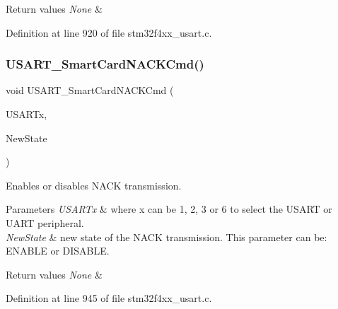 \begin{DoxyRetVals}{Return values}
{\em None} & \\
\hline
\end{DoxyRetVals}


Definition at line 920 of file stm32f4xx\+\_\+usart.\+c.

\mbox{\label{group___u_s_a_r_t_ga62e22f47e38aa53f2edce8771f7a5dfa}} 
\subsubsection{\texorpdfstring{U\+S\+A\+R\+T\+\_\+\+Smart\+Card\+N\+A\+C\+K\+Cmd()}{USART\_SmartCardNACKCmd()}}
{\footnotesize\ttfamily void U\+S\+A\+R\+T\+\_\+\+Smart\+Card\+N\+A\+C\+K\+Cmd (\begin{DoxyParamCaption}\item[{\hyperlink{struct_u_s_a_r_t___type_def}{U\+S\+A\+R\+T\+\_\+\+Type\+Def} $\ast$}]{U\+S\+A\+R\+Tx,  }\item[{Functional\+State}]{New\+State }\end{DoxyParamCaption})}



Enables or disables N\+A\+CK transmission. 


\begin{DoxyParams}{Parameters}
{\em U\+S\+A\+R\+Tx} & where x can be 1, 2, 3 or 6 to select the U\+S\+A\+RT or U\+A\+RT peripheral. \\
\hline
{\em New\+State} & new state of the N\+A\+CK transmission. This parameter can be\+: E\+N\+A\+B\+LE or D\+I\+S\+A\+B\+LE. \\
\hline
\end{DoxyParams}

\begin{DoxyRetVals}{Return values}
{\em None} & \\
\hline
\end{DoxyRetVals}


Definition at line 945 of file stm32f4xx\+\_\+usart.\+c.

\mbox{\label{group___u_s_a_r_t_ga34e1faa2f312496c16cfd05155f4c8b1}} 
